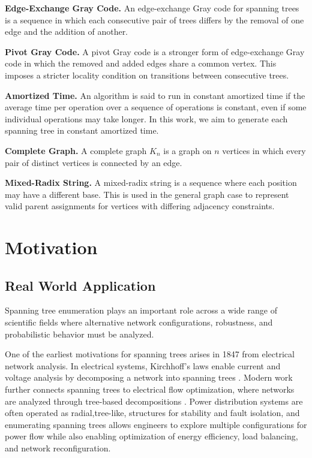 \documentclass{article}
\begin{document}
\textbf{Edge-Exchange Gray Code.} An edge-exchange Gray code for spanning trees is a sequence in which each consecutive pair of trees differs by the removal of one edge and the addition of another.

\textbf{Pivot Gray Code.} A pivot Gray code is a stronger form of edge-exchange Gray code in which the removed and added edges share a common vertex. This imposes a stricter locality condition on transitions between consecutive trees.

\textbf{Amortized Time.} An algorithm is said to run in constant amortized time if the average time per operation over a sequence of operations is constant, even if some individual operations may take longer. In this work, we aim to generate each spanning tree in constant amortized time.

\textbf{Complete Graph.} A complete graph $K_n$ is a graph on $n$ vertices in which every pair of distinct vertices is connected by an edge.

\textbf{Mixed-Radix String.} A mixed-radix string is a sequence where each position may have a different base. This is used in the general graph case to represent valid parent assignments for vertices with differing adjacency constraints.


\section{Motivation}
\subsection{Real World Application}
\label{headings}
Spanning tree enumeration plays an important role across a wide range of scientific fields where alternative network configurations, robustness, and probabilistic behavior must be analyzed. 

One of the earliest motivations for spanning trees arises in 1847 from electrical network analysis. In electrical systems, Kirchhoff’s laws enable current and voltage analysis by decomposing a network into spanning trees \cite{kirchhoff1847}. Modern work further connects spanning trees to electrical flow optimization, where networks are analyzed through tree-based decompositions \cite{kelner2013electrical, borradaile2020electrical}. Power distribution systems are often operated as radial,tree-like, structures for stability and fault isolation, and enumerating spanning trees allows engineers to explore multiple configurations for power flow while also enabling optimization of energy efficiency, load balancing, and network reconfiguration.
\end{document}
